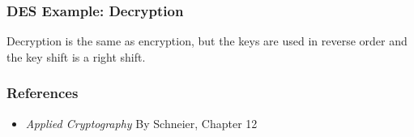 \documentclass{beamer}
\newcommand{\<}{\langle}
\renewcommand{\>}{\rangle}
\begin{document}
\begin{frame}
\frametitle{DES Example: Decryption}

Decryption is the same as encryption, but the keys are used in reverse order and the key shift is a right shift. 
\end{frame}


\begin{frame}
\frametitle{References}

\begin{itemize}
\item \emph{Applied Cryptography} By Schneier, Chapter 12
\end{itemize}
\end{frame}
\end{document}

